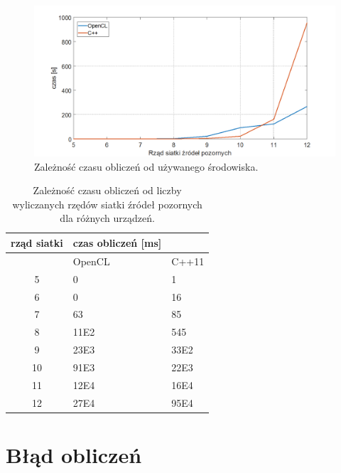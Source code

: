 \begin{figure}[H]
        \centering
                \centering
                \includegraphics[width=16cm]{wykres2}
	\caption{Zależność czasu obliczeń od używanego środowiska.}
\end{figure}

\begin{table}[H]
        \centering
        \begin{threeparttable}
                \caption{Zależność czasu obliczeń od liczby wyliczanych rzędów siatki źródeł pozornych dla różnych urządzeń.}\label{tab:table_exa2mple}
                \begin{tabularx}{0.6\textwidth}{| c | X | X |}
                        \midrule
                        	rząd siatki &	\multicolumn{1}{c}{czas obliczeń [ms]}  & \\
                 \midrule
		                         & OpenCL & C++11 \\
                 \midrule
 5 & 0 & 1   \\
6 & 0 & 16  \\
7 & 63 & 85  \\
8 & 11E2 & 545  \\
9 & 23E3 & 33E2  \\
10 & 91E3 & 22E3  \\
11 & 12E4 & 16E4 \\
12 & 27E4 & 95E4  \\
                        \bottomrule
                \end{tabularx}
        \end{threeparttable}
\end{table}


\section{Błąd obliczeń}\label{sec:asdas2sd}

